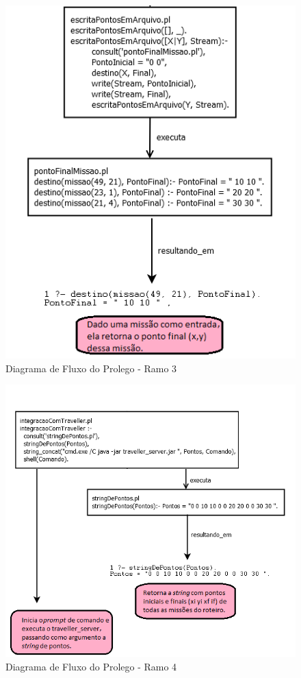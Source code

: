 \FloatBarrier
\begin{figure}[!h]
\centering
\includegraphics[keepaspectratio=true,scale=0.7]{figuras/DiagramaRamo3.png}
\caption{Diagrama de Fluxo do Prolego - Ramo 3}
\label{DiagramaRamo3}
\end{figure}



\FloatBarrier
\begin{figure}[!h]
\centering
\includegraphics[keepaspectratio=true,scale=0.7]{figuras/DiagramaRamo4.png}
\caption{Diagrama de Fluxo do Prolego - Ramo 4}
\label{DiagramaRamo4}
\end{figure}


